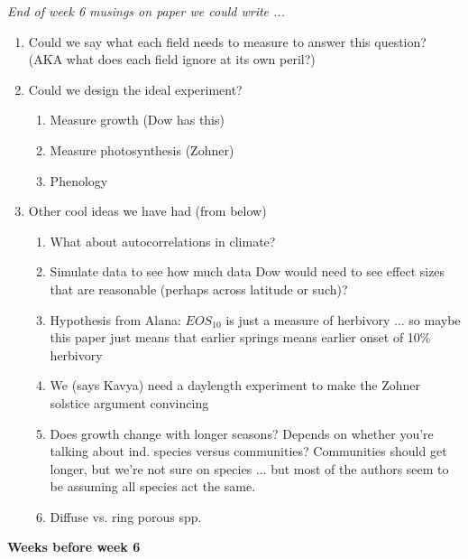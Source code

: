 \documentclass[11pt,letter]{article}
\begin{document}
\emph{End of week 6 musings on paper we could write ...}
\begin{enumerate}
\item Could we say what each field needs to measure to answer this question? (AKA what does each field ignore at its own peril?)
\item Could we design the ideal experiment?
\begin{enumerate}
\item Measure growth (Dow has this)
\item Measure photosynthesis (Zohner)
\item Phenology
\end{enumerate}
\item Other cool ideas we have had (from below)
\begin{enumerate}
\item What about autocorrelations in climate?
\item Simulate data to see how much data Dow would need to see effect sizes that are reasonable (perhaps across latitude or such)?
\item Hypothesis from Alana: $EOS_{10}$ is just a measure of herbivory ... so maybe this paper just means that earlier springs means earlier onset of 10\% herbivory 
\item We (says Kavya) need a daylength experiment to make the Zohner solstice argument convincing 
\item Does growth change with longer seasons? Depends on whether you're talking about ind. species versus communities? Communities should get longer, but we're not sure on species ... but most of the authors seem to be assuming all species act the same. 
\item Diffuse vs. ring porous spp. 
\end{enumerate}
\end{enumerate}


{\bf Weeks before week 6}
\end{document}
